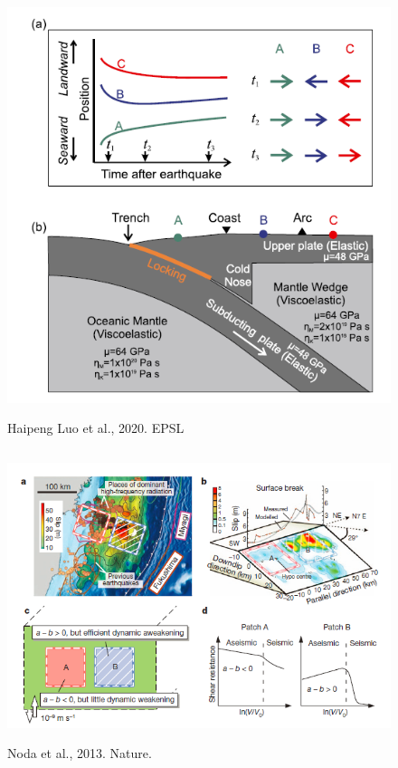﻿\documentclass{beamer}
\begin{document}
\begin{frame}
\begin{columns}[c]
\begin{figure}
  \centering
  \includegraphics[scale=0.35]{./pic/luo2020.png}\\
  \caption{Haipeng Luo et al., 2020. EPSL}\label{fig_okada}
\end{figure}

\end{columns}

\end{frame}

\begin{frame}
\begin{figure}
  \centering
  \includegraphics[scale=0.65]{./pic/noda2013.png}\\
  \caption{Noda et al., 2013. Nature.}\label{fig_okada}
\end{figure}
\end{frame}
\end{document}
